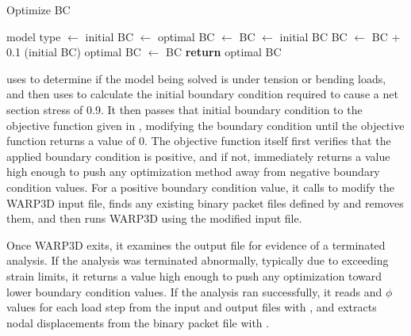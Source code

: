 \begin{algorithm}[tbp]
  \caption{Optimize BC}
  \label{alg:optimize_bc}
  \begin{algorithmic}
    \State {}
    \State model type $\gets$  %
    \State initial BC $\gets$ 
      \State optimal BC $\gets$ 
      \State {}
    \Else
      \State BC $\gets$ initial BC
        \State {}
        \State BC $\gets$ BC + 0.1 (initial BC)
      \EndWhile
      \State optimal BC $\gets$ BC
    \EndIf
    \State \textbf{return} optimal BC
    \EndProcedure
  \end{algorithmic}
\end{algorithm}

 uses  to determine if the model being solved is under tension or bending loads, and then uses  to calculate the initial boundary condition required to cause a net section stress of 0.9\Sys.
It then passes that initial boundary condition to the objective function given in , modifying the boundary condition until the objective function returns a value of 0.
The objective function itself first verifies that the applied boundary condition is positive, and if not, immediately returns a value high enough to push any optimization method away from negative boundary condition values.
For a positive boundary condition value, it calls  to modify the WARP3D input file, finds any existing binary packet files defined by  and removes them, and then runs WARP3D using the modified input file.

Once WARP3D exits, it examines the output file for evidence of a terminated analysis.
If the analysis was terminated abnormally, typically due to exceeding strain limits, it returns a value high enough to push any optimization toward lower boundary condition values.
If the analysis ran successfully, it reads \J and \(\phi\) values for each load step from the input and output files with , and extracts nodal displacements from the binary packet file with .

